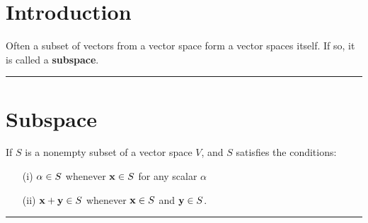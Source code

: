 %
\section*{Introduction}

Often a subset of vectors from a vector space form a vector spaces itself.  If so, it is called a \textbf{subspace}.


 
 
  

\rule[0.01in]{\textwidth}{0.0025in}


 

 

\section*{Subspace}
\begin{definition}


If $S$ is a nonempty subset of a vector space $V$, and $S$ satisfies the conditions: \\



	\begin{tcolorbox}[colback=yellow!10!,colframe=gray!15!]

\begin{enumerate}
	\item[(i)] $\alpha {\bf} \in S$ whenever ${\bf x} \in S$ for any scalar $\alpha$
	\item[(ii)] ${\bf x} + {\bf y} \in S$ whenever ${\bf x} \in S$ and ${\bf y} \in S$.
\end{enumerate}
	 
	\end{tcolorbox}
	
\end{definition}
	
\rule[0.01in]{\textwidth}{0.0025in}

